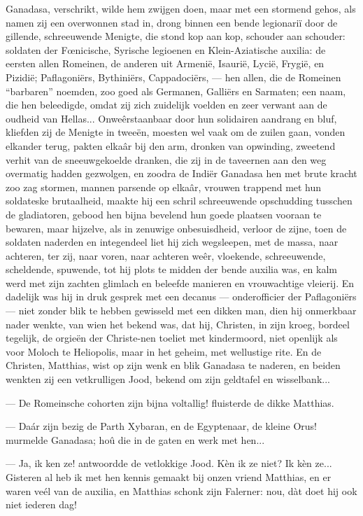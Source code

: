 \documentclass[a4paper, 12pt, oneside, dutch]{article}
\begin{document}
Ganadasa, verschrikt, wilde hem zwijgen doen, maar met een stormend gehos, als namen zij een overwonnen stad in, drong binnen een bende legionariï door de gillende, schreeuwende Menigte, die stond kop aan kop, schouder aan schouder: soldaten der Fœnicische, Syrische legioenen en Klein-Aziatische auxilia: de eersten allen Romeinen, de anderen uit Armenië, Isaurië, Lycië, Frygië, en Pizidië; Paflagoniërs, Bythiniërs, Cappadociërs, --- hen allen, die de Romeinen "`barbaren"' noemden, zoo goed als Germanen, Galliërs en Sarmaten; een naam, die hen beleedigde, omdat zij zich zuidelijk voelden en zeer verwant aan de oudheid van Hellas... Onweêrstaanbaar door hun solidairen aandrang en bluf, kliefden zij de Menigte in tweeën, moesten wel vaak om de zuilen gaan, vonden elkander terug, pakten elkaâr bij den arm, dronken van opwinding, zweetend verhit van de sneeuwgekoelde dranken, die zij in de taveernen aan den weg overmatig hadden gezwolgen, en zoodra de Indiër Ganadasa hen met brute kracht zoo zag stormen, mannen parsende op elkaâr, vrouwen trappend met hun soldateske brutaalheid, maakte hij een schril schreeuwende opschudding tusschen de gladiatoren, gebood hen bijna bevelend hun goede plaatsen vooraan te bewaren, maar hijzelve, als in zenuwige onbesuisdheid, verloor de zijne, toen de soldaten naderden en integendeel liet hij zich wegsleepen, met de massa, naar achteren, ter zij, naar voren, naar achteren weêr, vloekende, schreeuwende, scheldende, spuwende, tot hij plots te midden der bende auxilia was, en kalm werd met zijn zachten glimlach en beleefde manieren en vrouwachtige vleierij. En dadelijk was hij in druk gesprek met een decanus --- onderofficier der Paflagoniërs --- niet zonder blik te hebben gewisseld met een dikken man, dien hij onmerkbaar nader wenkte, van wien het bekend was, dat hij, Christen, in zijn kroeg, bordeel tegelijk, de orgieën der Christe-nen toeliet met kindermoord, niet openlijk als voor Moloch te Heliopolis, maar in het geheim, met wellustige rite. En de Christen, Matthias, wist op zijn wenk en blik Ganadasa te naderen, en beiden wenkten zij een vetkrulligen Jood, bekend om zijn geldtafel en wisselbank...

--- De Romeinsche cohorten zijn bijna voltallig! fluisterde de dikke Matthias.

--- Daár zijn bezig de Parth Xybaran, en de Egyptenaar, de kleine Orus! murmelde Ganadasa; hoû die in de gaten en werk met hen...

--- Ja, ik ken ze! antwoordde de vetlokkige Jood. Kèn ik ze niet? Ik kèn ze... Gisteren al heb ik met hen kennis gemaakt bij onzen vriend Matthias, en er waren veél van de auxilia, en Matthias schonk zijn Falerner: nou, dàt doet hij ook niet iederen dag!
\end{document}
